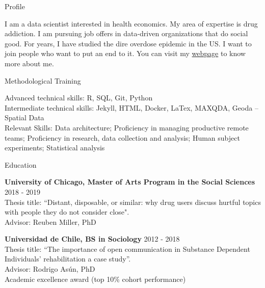 \documentclass{resume} %
\begin{document}
\begin{rSection}{Profile}

I am a data scientist interested in health economics. My area of expertise is drug addiction. I am pursuing job offers in data-driven organizations that do social good. For years, I have studied the dire overdose epidemic in the US. I want to join people who want to put an end to it. You can visit my \href{https://tristangramsch.github.io/}{webpage} to know more about me. 

\end{rSection}

\begin{rSection}{Methodological Training}

Advanced technical skills: R, SQL, Git, Python\\
Intermediate technical skills:  Jekyll, HTML, Docker, LaTex, MAXQDA, Geoda – Spatial Data\\
Relevant Skills: Data architecture; Proficiency in managing productive remote teams; Proficiency in research, data collection and analysis; Human subject experiments; Statistical analysis

\end{rSection}

\begin{rSection}{Education}

{\bf University of Chicago, Master of Arts Program in the Social Sciences} \hfill {2018 - 2019}
\\
Thesis title: “Distant, disposable, or similar: why drug users discuss hurtful topics with people they do not consider close".\\
Advisor: Reuben Miller, PhD

{\textbf{Universidad de Chile, BS in Sociology}}  \hfill 2012 - 2018\\
Thesis title: “The importance of open communication in Substance Dependent Individuals' rehabilitation a case study”.\\
Advisor: Rodrigo Asún, PhD\\
Academic excellence award (top 10\% cohort performance)
 
 \end{rSection}
\end{document}
